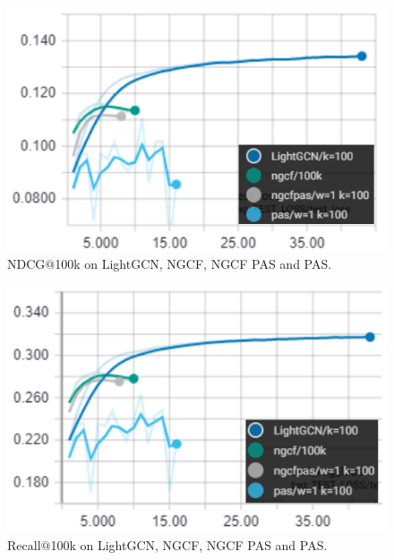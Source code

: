 \begin{figure}
    \includegraphics[width=\linewidth]{figures/graphs/ndcg-100k-lgcn-ngcf-ngcfpas-pas.png}
    \caption{NDCG$@$100k on LightGCN, NGCF, NGCF PAS and PAS.}
    \label{fig:ndcg-100k-lgcn-ngcf-ngcfpas-pas}
\end{figure}

\begin{figure}
    \includegraphics[width=\linewidth]{figures/graphs/recall-100k-lgcn-ngcf-ngcfpas-pas.png}
    \caption{Recall$@$100k on LightGCN, NGCF, NGCF PAS and PAS.}
    \label{fig:recall-100k-lgcn-ngcf-ngcfpas-pas}
\end{figure}


